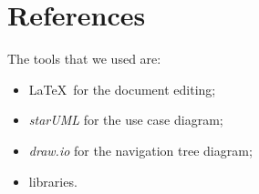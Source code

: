 \documentclass[11pt]{article}
\begin{document}
\section{References}\label{sec:ref}
The tools that we used are:
\begin{itemize}
    \item \LaTeX\ for the document editing;
    \item \textit{starUML} for the use case diagram;
    \item \textit{draw.io} for the navigation tree diagram;
    \item libraries.
\end{itemize}
\end{document}
